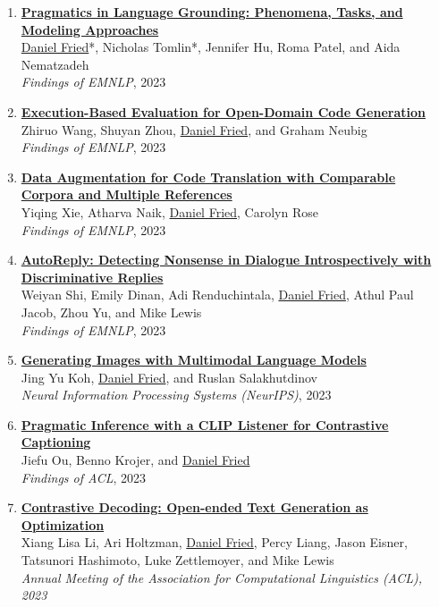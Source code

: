 \begin{enumerate}[leftmargin=-1mm,partopsep=0pt]
  \item \href{https://arxiv.org/abs/2211.08371}{\textbf{Pragmatics in Language Grounding: Phenomena, Tasks, and Modeling Approaches}} \\
    \underline{Daniel Fried}*, Nicholas Tomlin*, Jennifer Hu, Roma Patel, and Aida Nematzadeh \\
    \emph{Findings of EMNLP}, 2023

  \item \href{https://arxiv.org/abs/2212.10481}{\textbf{Execution-Based Evaluation for Open-Domain Code Generation}} \\
    Zhiruo Wang, Shuyan Zhou, \underline{Daniel Fried}, and Graham Neubig \\
    \emph{Findings of EMNLP}, 2023

  \item \href{https://arxiv.org/abs/2311.00317}{\textbf{Data Augmentation for Code Translation with Comparable Corpora and Multiple References}} \\
    Yiqing Xie, Atharva Naik, \underline{Daniel Fried}, Carolyn Rose \\
    \emph{Findings of EMNLP}, 2023

  \item \href{https://arxiv.org/abs/2211.12615}{\textbf{AutoReply: Detecting Nonsense in Dialogue Introspectively with Discriminative Replies}} \\
    Weiyan Shi, Emily Dinan, Adi Renduchintala, \underline{Daniel Fried}, Athul Paul Jacob, Zhou Yu, and Mike Lewis \\
    \emph{Findings of EMNLP}, 2023

  \item \href{https://arxiv.org/abs/2305.17216}{\textbf{Generating Images with Multimodal Language Models}} \\
    Jing Yu Koh, \underline{Daniel Fried}, and Ruslan Salakhutdinov \\
    \emph{Neural Information Processing Systems (NeurIPS)}, 2023

  \item \href{https://arxiv.org/abs/2306.08818}{\textbf{Pragmatic Inference with a CLIP Listener for Contrastive Captioning}} \\
    Jiefu Ou, Benno Krojer, and \underline{Daniel Fried} \\
    \emph{Findings of ACL}, 2023

  \item \href{https://arxiv.org/abs/2210.15097}{\textbf{Contrastive Decoding: Open-ended Text Generation as Optimization}} \\
    Xiang Lisa Li, Ari Holtzman, \underline{Daniel Fried}, Percy Liang, Jason Eisner, Tatsunori Hashimoto, Luke Zettlemoyer, and Mike Lewis \\
    \emph{Annual Meeting of the Association for Computational Linguistics (ACL), 2023}


\end{enumerate}
